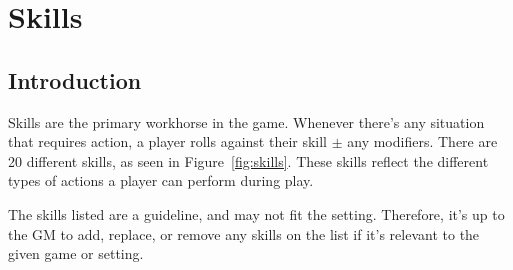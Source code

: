 \chapter{Skills} \label{chap:skills}
\section{Introduction}
Skills are the primary workhorse in the game. 
Whenever there's any situation that requires action, a player rolls against their skill $\pm$ any modifiers. 
There are 20 different skills, as seen in Figure~\ref{fig:skills}. 
These skills reflect the different types of actions a player can perform during play.

\begin{note} 
    The skills listed are a guideline, and may not fit the setting. 
    Therefore, it's up to the GM to add, replace, or remove any skills on the list if it's relevant to the given game or setting.
\end{note}





